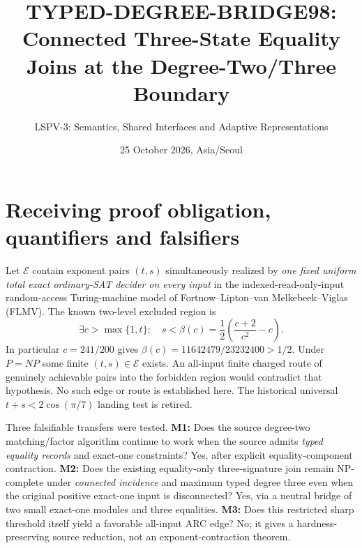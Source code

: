\documentclass[11pt]{article}
\title{TYPED-DEGREE-BRIDGE98: Connected Three-State Equality Joins at the Degree-Two/Three Boundary}
\author{LSPV-3: Semantics, Shared Interfaces and Adaptive Representations}
\date{25 October 2026, Asia/Seoul}
\begin{document}
\maketitle
\begin{center}
\end{center}

\section{Receiving proof obligation, quantifiers and falsifiers}
Let $\mathcal E$ contain exponent pairs $(t,s)$ simultaneously realized by \emph{one fixed uniform total exact ordinary-SAT decider on every input} in the indexed-read-only-input random-access Turing-machine model of Fortnow--Lipton--van Melkebeek--Viglas (FLMV). The known two-level excluded region is
\[
 \exists c>\max\{1,t\}:\quad s<
 \beta(c)=\frac12\left(\frac{c+2}{c^2}-c\right).
\]
In particular $c=241/200$ gives
$\beta(c)=11642479/23232400>1/2$. Under $P=NP$ some finite $(t,s)\in\mathcal E$ exists. An all-input finite charged route of genuinely achievable pairs into the forbidden region would contradict that hypothesis. No such edge or route is established here. The historical universal $t+s<2\cos(\pi/7)$ landing test is retired.

Three falsifiable transfers were tested. \textbf{M1:} Does the source degree-two matching/factor algorithm continue to work when the source admits \emph{typed equality records} and exact-one constraints? Yes, after explicit equality-component contraction. \textbf{M2:} Does the existing equality-only three-signature join remain NP-complete under \emph{connected incidence} and maximum typed degree three even when the original positive exact-one input is disconnected? Yes, via a neutral bridge of two small exact-one modules and three equalities. \textbf{M3:} Does this restricted sharp threshold itself yield a favorable all-input ARC edge? No; it gives a hardness-preserving source reduction, not an exponent-contraction theorem.
\end{document}
